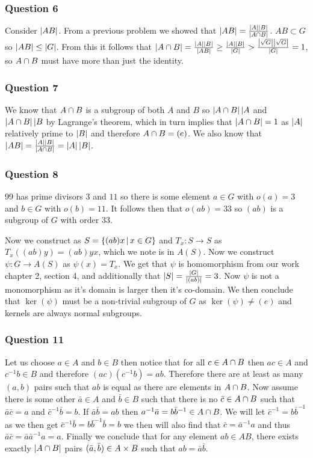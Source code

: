 \documentclass{article}
\begin{document}
\subsubsection{Question 6}
Consider $\left| {AB} \right|$. From a previous problem we showed that $\left| {AB} \right|=\frac{\left| {A} \right|\left| {B} \right|}{\left| {A\cap B} \right|}$. $AB \subset G$ so $\left| {AB} \right|\le\left| {G} \right|$. From this it follows that $\left| {A\cap B} \right|= \frac{\left| {A} \right|\left| {B} \right|}{\left| {AB} \right|} \ge \frac{\left| {A} \right|\left| {B} \right|}{\left| {G} \right|} > \frac{\left| {\sqrt G} \right|\left| {\sqrt G} \right|}{\left| {G} \right|} = 1$, so $A\cap B$ must have more than just the identity.

\subsubsection{Question 7}
We know that $A\cap B$ is a subgroup of both $A$ and $B$ so $\left| {A\cap B} \right||A$ and $\left| {A\cap B} \right| | B$ by Lagrange's theorem, which in turn implies that $\left| {A\cap B} \right| = 1$ as $\left| {A} \right|$ relatively prime to $\left| {B} \right|$ and therefore $A\cap B = (e)$. We also know that $\left| {AB} \right| = \frac{\left| {A} \right|\left| {B} \right|}{\left| {A\cap B} \right|} = \left| {A} \right|\left| {B} \right|$.

\subsubsection{Question 8}

99 has prime divisors $3$ and $11$ so there is some element $a \in G$ with $o(a) = 3$ and $b\in G$ with $o(b) = 11$. It follows then that $o(ab) = 33$ so $(ab)$ is a subgroup of $G$ with order 33.

Now we construct as $S=\left\{{(ab)x} \,\middle|\, {x\in G}\right\}$ and $T_x:S\to S$ as $T_x((ab)y) = (ab)yx$, which we note is in $A(S)$. Now we construct $\psi:G\to A(S)$ as $\psi(x) = T_x$. We get that $\psi$ is homomorphism from our work chapter 2, section 4, and additionally that $\left|{S}\right| = \frac{\left| {G} \right|}{\left| {(ab)} \right|} = 3$. Now $\psi$ is not a monomorphism as it's domain is larger then it's co-domain. We then conclude that $\ker(\psi)$ must be a non-trivial subgroup of $G$ as $\ker(\psi) \not = (e)$ and kernels are always normal subgroups.

\subsubsection{Question 11}


Let us choose $a \in A$ and $b \in B$ then notice that for all $c \in A\cap B$ then $ac \in A$ and $c^{-1}b \in B$ and therefore $(ac)(c^{-1}b) = ab$. Therefore there are at least as many $(a,b)$ pairs such that $ab$ is equal as there are elements in $A \cap B$. Now assume there is some other $\bar a \in A$ and $\bar b \in B$ such that there is no $\bar c \in A\cap B$ such that $\bar a \bar c = a$ and ${\bar c}^{-1}\bar b = b$. If $\bar a\bar b = ab$ then $a^{-1}\bar a = b\bar b^{-1} \in A\cap B$. We will let $\bar c^{-1} = b\bar b^{-1}$ as we then get $\bar c^{-1}\bar b = b\bar b^{-1}\bar b = b$ we then will also find that $\bar c= \bar a^{-1}a$ and thus $\bar a\bar c = \bar a\bar a^{-1}a = a$. Finally we conclude that for any element $ab \in AB$, there exists exactly $\left| {A \cap B} \right|$ pairs $(\bar a,\bar b) \in A\times B$ such that $ab = \bar a\bar b$.
\end{document}
